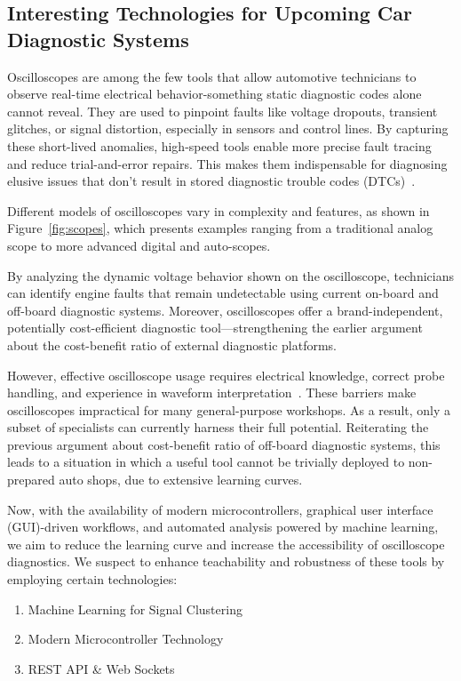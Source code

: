\documentclass[conference,a4paper]{IEEEtran}
\begin{document}
\subsection{Interesting Technologies for Upcoming Car Diagnostic Systems}
Oscilloscopes are among the few tools that allow automotive technicians to observe real-time electrical behavior-something static diagnostic codes alone cannot reveal. 
They are used to pinpoint faults like voltage dropouts, transient glitches, or signal distortion, especially in sensors and control lines.
By capturing these short-lived anomalies, high-speed tools enable more precise fault tracing and reduce trial-and-error repairs. 
This makes them indispensable for diagnosing elusive issues that don’t result in stored diagnostic trouble codes (DTCs)~\cite{tektronix2024, fleetmaintenance2024, picoauto2023, fleetmaintenance2020}.

Different models of oscilloscopes vary in complexity and features, as shown in Figure~\ref{fig:scopes}, 
which presents examples ranging from a traditional analog scope to more advanced digital and auto-scopes.

By analyzing the dynamic voltage behavior shown on the oscilloscope, technicians can identify engine faults that remain undetectable using current on-board and off-board diagnostic systems.
Moreover, oscilloscopes offer a brand-independent, potentially cost-efficient diagnostic tool—strengthening the earlier argument about the cost-benefit ratio of external diagnostic platforms.

However, effective oscilloscope usage requires electrical knowledge, correct probe handling, and experience in waveform interpretation~\cite{rohde2024, autoditex2023, pico2021, mechanic2024}. 
These barriers make oscilloscopes impractical for many general-purpose workshops. 
As a result, only a subset of specialists can currently harness their full potential. 
Reiterating the previous argument about cost-benefit ratio of off-board diagnostic systems, 
this leads to a situation in which a useful tool cannot be trivially deployed to non-prepared auto shops, due to extensive learning curves.

Now, with the availability of modern microcontrollers, graphical user interface (GUI)-driven workflows, and automated analysis powered by machine learning, 
we aim to reduce the learning curve and increase the accessibility of oscilloscope diagnostics. 
We suspect to enhance teachability and robustness of these tools by employing certain technologies:
\begin{enumerate}[label=\alph*)]
  \item Machine Learning for Signal Clustering
  \item Modern Microcontroller Technology
  \item REST API \& Web Sockets
\end{enumerate}
\end{document}
